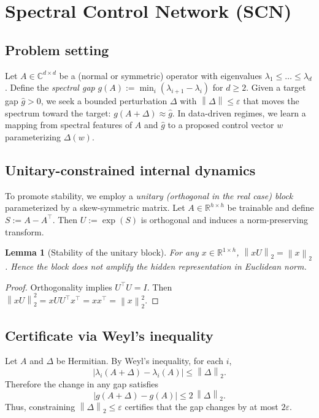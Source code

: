\documentclass[11pt]{article}
\newtheorem{lemma}{Lemma}
\theoremstyle{definition}
\theoremstyle{remark}
\newcommand{\C}{\mathbb{C}}
\newcommand{\R}{\mathbb{R}}
\newcommand{\norm}[1]{\left\lVert #1 \right\rVert}
\newcommand{\abs}[1]{\left\lvert #1 \right\rvert}
\begin{document}
\section{Spectral Control Network (SCN)}
\label{sec:scn}

\subsection{Problem setting}
Let \(A\in\C^{d\times d}\) be a (normal or symmetric) operator with eigenvalues \(\lambda_1\le \dots \le \lambda_d\).
Define the \emph{spectral gap} \(g(A):=\min_{i}(\lambda_{i+1}-\lambda_i)\) for \(d\ge 2\).
Given a target gap \(\hat g>0\), we seek a bounded perturbation \(\Delta\) with \(\norm{\Delta}\le \varepsilon\) that moves the spectrum toward the target: \(g(A+\Delta)\approx \hat g\).
In data-driven regimes, we learn a mapping from spectral features of \(A\) and \(\hat g\) to a proposed control vector \(w\) parameterizing \(\Delta(w)\).

\subsection{Unitary-constrained internal dynamics}
To promote stability, we employ a \emph{unitary (orthogonal in the real case) block} parameterized by a skew-symmetric matrix. 
Let \(A\in\R^{h\times h}\) be trainable and define \(S:=A-A^\top\). Then \(U:=\exp(S)\) is orthogonal and induces a norm-preserving transform.

\begin{lemma}[Stability of the unitary block]
\label{lem:unitary}
For any \(x\in\R^{1\times h}\), \( \norm{xU}_2 = \norm{x}_2\).
Hence the block does not amplify the hidden representation in Euclidean norm.
\end{lemma}

\begin{proof}
Orthogonality implies \(U^\top U = I\). Then \(\norm{xU}_2^2 = xUU^\top x^\top = xx^\top = \norm{x}_2^2\).
\end{proof}

\subsection{Certificate via Weyl's inequality}
Let \(A\) and \(\Delta\) be Hermitian. By Weyl's inequality, for each \(i\),
\[
  \abs{\lambda_i(A+\Delta)-\lambda_i(A)} \le \norm{\Delta}_2.
\]
Therefore the change in any gap satisfies
\begin{equation}
\label{eq:gap-bound}
  \abs{g(A+\Delta) - g(A)} \le 2\,\norm{\Delta}_2.
\end{equation}
Thus, constraining \(\norm{\Delta}_2\le \varepsilon\) certifies that the gap changes by at most \(2\varepsilon\).
\end{document}
